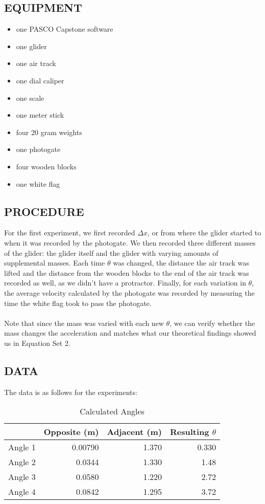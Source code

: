 \documentclass [12pt, letterpaper, twoside] {article}
\begin{document}
\subsection* {EQUIPMENT}
  \noindent
  \begin {itemize}
    \itemsep0em
    \item {one PASCO Capstone software}
    \item {one glider}
    \item {one air track}
    \item {one dial caliper}
    \item {one scale}
    \item {one meter stick}
    \item {four 20 gram weights}
    \item {one photogate}
    \item {four wooden blocks}
    \item {one white flag}
  \end {itemize}

\subsection* {PROCEDURE}
For the first experiment, we first recorded \(\Delta{x}\), or from where the glider started to when it was recorded by the photogate. We then recorded three different masses of the glider: the glider itself and the glider with varying amounts of supplemental masses. Each time \(\theta\) was changed, the distance the air track was lifted and the distance from the wooden blocks to the end of the air track was recorded as well, as we didn't have a protractor. Finally, for each variation in \(\theta\), the average velocity calculated by the photogate was recorded by measuring the time the white flag took to pass the photogate. \\\\
Note that since the mass was varied with each new \(\theta\), we can verify whether the mass changes the acceleration and matches what our theoretical findings showed us in Equation Set 2.

\subsection* {DATA}
The data is as follows for the experiments:
\begin {table}[h]
  \centering
  \begin {tabular}{| l | r | r | r |}
    \hline\hline
    & Opposite (m) & Adjacent (m) & Resulting \(\theta\) \\
    \hline
    Angle 1 & 0.00790 & 1.370 & 0.330 \\ %
    \hline
    Angle 2 & 0.0344 & 1.330 & 1.48 \\ %
    \hline
    Angle 3 & 0.0580 & 1.220 & 2.72 \\ %
    \hline
    Angle 4 & 0.0842 & 1.295 & 3.72 \\ %
    \hline\hline
  \end {tabular}
  \caption {Calculated Angles}
\end {table}
\end{document}
